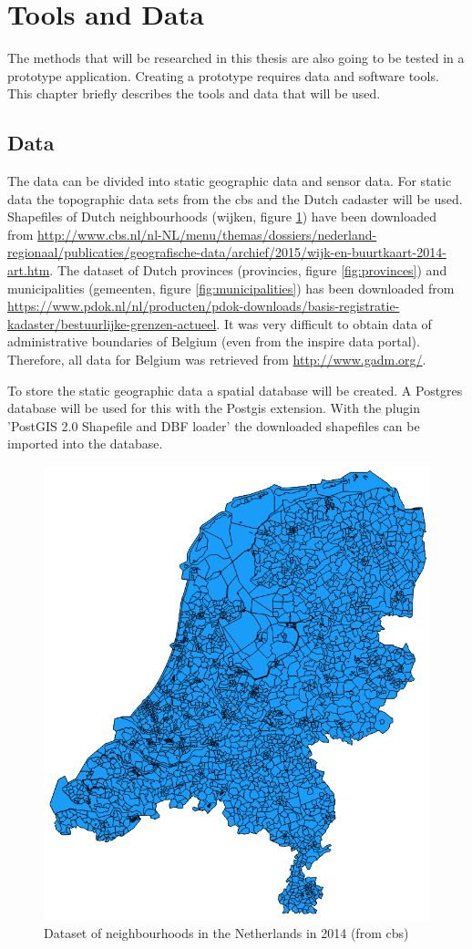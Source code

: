 

\section{Tools and Data}
\label{chap:TD}

The methods that will be researched in this thesis are also going to be tested in a prototype application. Creating a prototype requires data and software tools. This chapter briefly describes the tools and data that will be used.  

\subsection{Data}
\begin{sloppypar}
The data can be divided into static geographic data and sensor data. For static data the topographic data sets from the \ac{cbs} and the Dutch cadaster will be used. Shapefiles of Dutch neighbourhoods (wijken, figure \ref{fig:neighbourhoods}) have been downloaded from \url{http://www.cbs.nl/nl-NL/menu/themas/dossiers/nederland-regionaal/publicaties/geografische-data/archief/2015/wijk-en-buurtkaart-2014-art.htm}. The dataset of Dutch provinces (provincies, figure \ref{fig:provinces}) and municipalities (gemeenten, figure \ref{fig:municipalities}) has been downloaded from \url{https://www.pdok.nl/nl/producten/pdok-downloads/basis-registratie-kadaster/bestuurlijke-grenzen-actueel}. It was very difficult to obtain data of administrative boundaries of Belgium (even from the \ac{inspire} data portal). Therefore, all data for Belgium was retrieved from \url{http://www.gadm.org/}.
\end{sloppypar}

To store the static geographic data a spatial database will be created. A Postgres database will be used for this with the Postgis extension. With the plugin 'PostGIS 2.0 Shapefile and DBF loader' the downloaded shapefiles can be imported into the database.  

\begin{figure}
	\centering
	\includegraphics[width=0.5\linewidth]{figs/Neighbourhoods.png}
	\caption{Dataset of neighbourhoods in the Netherlands in 2014 (from \ac{cbs})}
	\label{fig:neighbourhoods}
\end{figure}


